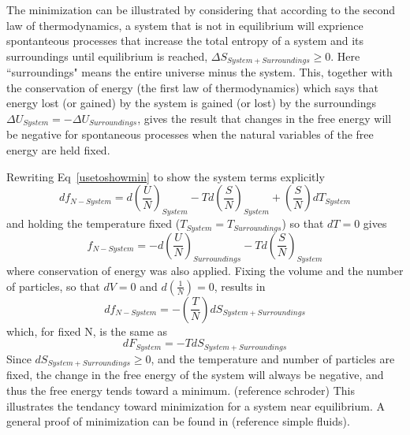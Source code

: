 \documentclass[12pt]{article}
\begin{document}
The minimization can be illustrated by considering that according to the second law of thermodynamics, a system that is not in equilibrium will exprience spontanteous processes that increase the total entropy of a system and its surroundings until equilibrium is reached, $\Delta{S}_{System + Surroundings} \geq 0$. Here ``surroundings" means the entire universe minus the system. This, together with the conservation of energy (the first law of thermodynamics) which says that energy lost (or gained) by the system is gained (or lost) by the surroundings $\Delta{U}_{System}=-\Delta{U}_{Surroundings}$, gives the result that changes in the free energy will be negative for spontaneous processes when the natural variables of the free energy are held fixed. %

Rewriting Eq~\ref{usetoshowmin} to show the system terms explicitly
\begin{equation}
  df_{N-System}=d\left(\frac{U}{N}\right)_{System}-Td\left(\frac{S}{N}\right)_{System}+\left(\frac{S}{N}\right)dT_{System}
\end{equation}
and holding the temperature fixed ($T_{System}=T_{Surroundings}$) so that $dT=0$ gives
\begin{equation}
  f_{N-System}=-d\left(\frac{U}{N}\right)_{Surroundings}-Td\left(\frac{S}{N}\right)_{System}
\end{equation}
where conservation of energy was also applied. Fixing the volume and the number of particles, so that $dV=0$ and $d\left(\frac{1}{N}\right)=0$, results in
\begin{equation}
  df_{N-System}=-\left(\frac{T}{N}\right)dS_{System+Surroundings}
\end{equation}
which, for fixed N, is the same as
\begin{equation}dF_{System}=-TdS_{System+Surroundings} \end{equation} Since $dS_{System+Surroundings} \geq{0}$, and the temperature and number of particles are fixed, the change in the free energy of the system will always be negative, and thus the free energy tends toward a minimum. (reference schroder) This illustrates the tendancy toward minimization for a system near equilibrium. A general proof of minimization can be found in (reference simple fluids).
\end{document}
